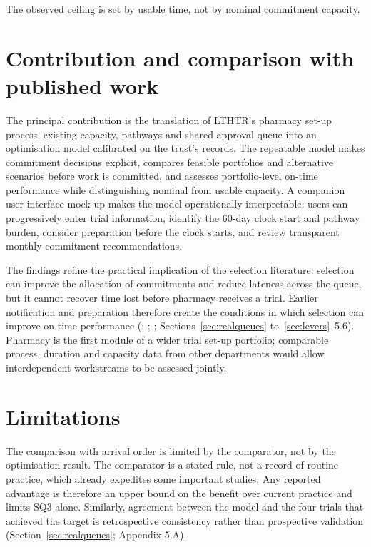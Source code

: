 The observed ceiling is set by usable time, not by nominal commitment capacity.

\section{Contribution and comparison with published work}
\label{sec:contrib6}

The principal contribution is the translation of LTHTR's pharmacy set-up process, existing capacity, pathways and shared approval queue into an optimisation model calibrated on the trust's records. The repeatable model makes commitment decisions explicit, compares feasible portfolios and alternative scenarios before work is committed, and assesses portfolio-level on-time performance while distinguishing nominal from usable capacity. A companion user-interface mock-up makes the model operationally interpretable: users can progressively enter trial information, identify the 60-day clock start and pathway burden, consider preparation before the clock starts, and review transparent monthly commitment recommendations.

The findings refine the practical implication of the selection literature: selection can improve the allocation of commitments and reduce lateness across the queue, but it cannot recover time lost before pharmacy receives a trial. Earlier notification and preparation therefore create the conditions in which selection can improve on-time performance (\citealp{SlotnickMorton2007OrderAcceptance}; \citealp{Munoz2018ProposalSelection}; \citealp{Qi2022EquitableEnrolment}; Sections~\ref{sec:realqueues} to~\ref{sec:levers}--5.6). Pharmacy is the first module of a wider trial set-up portfolio; comparable process, duration and capacity data from other departments would allow interdependent workstreams to be assessed jointly.

\section{Limitations}
\label{sec:limitations}

The comparison with arrival order is limited by the comparator, not by the optimisation result. The comparator is a stated rule, not a record of routine practice, which already expedites some important studies. Any reported advantage is therefore an upper bound on the benefit over current practice and limits SQ3 alone. Similarly, agreement between the model and the four trials that achieved the target is retrospective consistency rather than prospective validation (Section~\ref{sec:realqueues}; Appendix 5.A).

